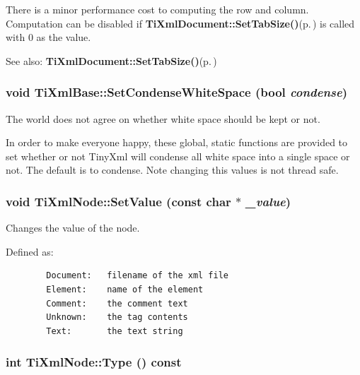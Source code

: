There is a minor performance cost to computing the row and column. Computation can be disabled if {\bf Ti\-Xml\-Document::Set\-Tab\-Size()}{\rm (p.\,\pageref{classTiXmlDocument_TiXmlDocumenta20})} is called with 0 as the value.

\begin{Desc}
\item[See also:]{\bf Ti\-Xml\-Document::Set\-Tab\-Size()}{\rm (p.\,\pageref{classTiXmlDocument_TiXmlDocumenta20})}\end{Desc}
\subsubsection{\setlength{\rightskip}{0pt plus 5cm}void Ti\-Xml\-Base::Set\-Condense\-White\-Space (bool {\em condense})\hspace{0.3cm}{\tt  [inline, static, inherited]}}\label{classTiXmlBase_TiXmlUnknowne0}


The world does not agree on whether white space should be kept or not. 

In order to make everyone happy, these global, static functions are provided to set whether or not Tiny\-Xml will condense all white space into a single space or not. The default is to condense. Note changing this values is not thread safe.
\subsubsection{\setlength{\rightskip}{0pt plus 5cm}void Ti\-Xml\-Node::Set\-Value (const char $\ast$ {\em \_\-value})\hspace{0.3cm}{\tt  [inline, inherited]}}\label{classTiXmlNode_TiXmlUnknowna9}


Changes the value of the node. 

Defined as: 

\footnotesize\begin{verbatim}
		Document:	filename of the xml file
		Element:	name of the element
		Comment:	the comment text
		Unknown:	the tag contents
		Text:		the text string
		\end{verbatim}
\normalsize
{}
\subsubsection{\setlength{\rightskip}{0pt plus 5cm}int Ti\-Xml\-Node::Type () const\hspace{0.3cm}{\tt  [inline, inherited]}}\label{classTiXmlNode_TiXmlUnknowna62}



